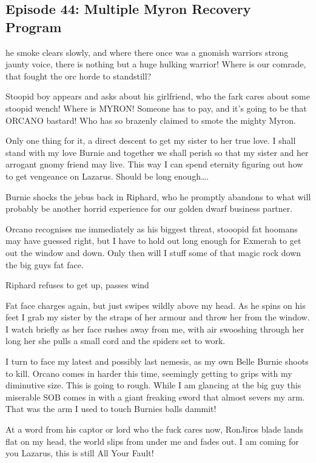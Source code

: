 \subsection{Episode 44: Multiple Myron Recovery Program}

he smoke clears slowly, and where there once was a gnomish warriors strong jaunty voice, there is nothing but a huge hulking warrior! Where is our comrade, that fought the orc horde to standstill?\medskip

Stoopid boy appears and asks about his girlfriend, who the fark cares about some stoopid wench! Where is MYRON! Someone has to pay, and it's going to be that ORCANO bastard! Who has so brazenly claimed to smote the mighty Myron.\medskip

Only one thing for it, a direct descent to get my sister to her true love. I shall stand with my love Burnie and together we shall perish so that my sister and her arrogant gnomy friend may live. This way I can spend eternity figuring out how to get vengeance on Lazarus. Should be long enough\ldots.\medskip

Burnie shocks the jebus back in Riphard, who he promptly abandons to what will probably be another horrid experience for our golden dwarf business partner.\medskip

Orcano recognises me immediately as his biggest threat, stooopid fat hoomans may have guessed right, but I have to hold out long enough for Exmerah to get out the window and down. Only then will I stuff some of that magic rock down the big guys fat face.\medskip

Riphard refuses to get up, passes wind\medskip

Fat face charges again, but just swipes wildly above my head. As he spins on his feet I grab my sister by the straps of her armour and throw her from the window. I watch briefly as her face rushes away from me, with air swooshing through her long her she pulls a small cord and the spiders set to work.\medskip

I turn to face my latest and possibly last nemesis, as my own Belle Burnie shoots to kill. Orcano comes in harder this time, seemingly getting to grips with my diminutive size. This is going to rough. While I am glancing at the big guy this miserable SOB comes in with a giant freaking sword that almost severs my arm. That was the arm I used to touch Burnies balls dammit!\medskip

At a word from his captor or lord who the fuck cares now, RonJiros blade lands flat on my head, the world slips from under me and fades out. I am coming for you Lazarus, this is still All Your Fault!\medskip

